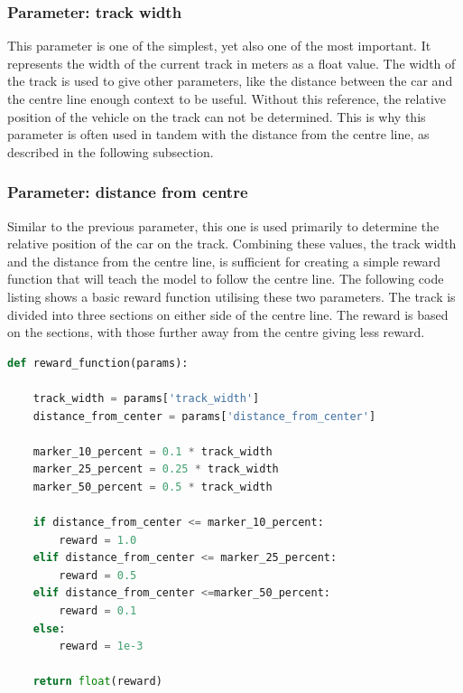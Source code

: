 \subsubsection{Parameter: track width}
This parameter is one of the simplest, yet also one of the most important. It represents the width of the current track in meters as a float value. The width of the track is used to give other parameters, like the distance between the car and the centre line enough context to be useful. Without this reference, the relative position of the vehicle on the track can not be determined. This is why this parameter is often used in tandem with the distance from the centre line, as described in the following subsection.

\subsubsection{Parameter: distance from centre}
Similar to the previous parameter, this one is used primarily to determine the relative position of the car on the track. Combining these values, the track width and the distance from the centre line, is sufficient for creating a simple reward function that will teach the model to follow the centre line. The following code listing shows a basic reward function utilising these two parameters. The track is divided into three sections on either side of the centre line. The reward is based on the sections, with those further away from the centre giving less reward.

\begin{minipage}{\linewidth}
\begin{lstlisting}[language={Python},label={lst:reward_distance}, caption={Reward function using track width and distance from centre}]
def reward_function(params):

    track_width = params['track_width']
    distance_from_center = params['distance_from_center']

    marker_10_percent = 0.1 * track_width
    marker_25_percent = 0.25 * track_width
    marker_50_percent = 0.5 * track_width

    if distance_from_center <= marker_10_percent:
        reward = 1.0
    elif distance_from_center <= marker_25_percent:
        reward = 0.5
    elif distance_from_center <=marker_50_percent:
        reward = 0.1
    else:
        reward = 1e-3

    return float(reward)
\end{lstlisting}
\end{minipage}

